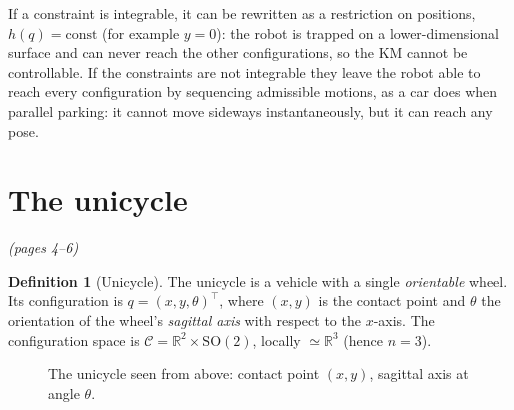 \documentclass[11pt,a4paper]{article}
\newcommand{\R}{\mathbb{R}}
\newcommand{\SO}{\mathrm{SO}}
\theoremstyle{definition}
\newtheorem{definition}{Definition}[section]
\theoremstyle{plain}
\theoremstyle{remark}
\begin{document}
\begin{intuition}
If a constraint is integrable, it can be rewritten as a restriction on positions, $h(q)=\text{const}$ (for example $y=0$): the robot is trapped on a lower-dimensional surface and can never reach the other configurations, so the KM cannot be controllable. If the constraints are not integrable they leave the robot able to reach every configuration by sequencing admissible motions, as a car does when parallel parking: it cannot move sideways instantaneously, but it can reach any pose.
\end{intuition}

\section{The unicycle}\emph{(pages 4--6)}

\begin{definition}[Unicycle]
The unicycle is a vehicle with a single \emph{orientable} wheel. Its configuration is $q=(x,y,\theta)^{\!\top}$, where $(x,y)$ is the contact point and $\theta$ the orientation of the wheel's \emph{sagittal axis} with respect to the $x$-axis. The configuration space is $\mathcal{C}=\R^2\times \SO(2)$, locally $\simeq\R^3$ (hence $n=3$).
\end{definition}

\begin{figure}[h]
\centering
{}
\caption{The unicycle seen from above: contact point $(x,y)$, sagittal axis at angle $\theta$.}
\end{figure}
\end{document}
